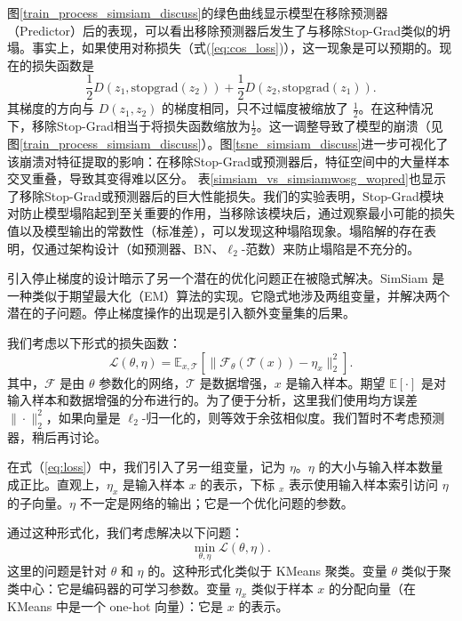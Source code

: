 \documentclass[master]{thesis-uestc}
\begin{document}
图\ref{train_process_simsiam_discuss}的绿色曲线显示模型在移除预测器（Predictor）后的表现，可以看出移除预测器后发生了与移除Stop-Grad类似的坍塌。事实上，如果使用对称损失（式(\ref{eq:cos_loss})），这一现象是可以预期的。现在的损失函数是
\begin{equation}
    \frac{1}{2}D(z_1, \text{stopgrad}(z_2)) + \frac{1}{2}D(z_2, \text{stopgrad}(z_1)).
\end{equation}
其梯度的方向与 $D(z_1, z_2)$ 的梯度相同，只不过幅度被缩放了 $\frac{1}{2}$。在这种情况下，移除Stop-Grad相当于将损失函数缩放为$\frac{1}{2}$。这一调整导致了模型的崩溃（见图\ref{train_process_simsiam_discuss}）。图\ref{tsne_simsiam_discuss}进一步可视化了该崩溃对特征提取的影响：在移除Stop-Grad或预测器后，特征空间中的大量样本交叉重叠，导致其变得难以区分。
表\ref{simsiam_vs_simsiamwosg_wopred}也显示了移除Stop-Grad或预测器后的巨大性能损失。我们的实验表明，Stop-Grad模块对防止模型塌陷起到至关重要的作用，当移除该模块后，通过观察最小可能的损失值以及模型输出的常数性（标准差），可以发现这种塌陷现象。塌陷解的存在表明，仅通过架构设计（如预测器、BN、$\ell_{2}$-范数）来防止塌陷是不充分的。

引入停止梯度的设计暗示了另一个潜在的优化问题正在被隐式解决。SimSiam 是一种类似于期望最大化（EM）算法的实现。它隐式地涉及两组变量，并解决两个潜在的子问题。停止梯度操作的出现是引入额外变量集的后果。

我们考虑以下形式的损失函数：
\begin{equation}
\label{eq:loss}
\mathcal{L}(\theta,\eta)=\mathbb{E}_{x,\mathcal{T}}\left[\|\mathcal{F}_{\theta} (\mathcal{T}(x))-\eta_{x}\|^{2}_{2}\right].
\end{equation}
其中，$\mathcal{F}$ 是由 $\theta$ 参数化的网络，$\mathcal{T}$ 是数据增强，$x$ 是输入样本。期望 $\mathbb{E}[\cdot]$ 是对输入样本和数据增强的分布进行的。为了便于分析，这里我们使用均方误差 $\|\cdot\|^{2}_{2}$，如果向量是 $\ell_{2}$-归一化的，则等效于余弦相似度。我们暂时不考虑预测器，稍后再讨论。

在式（\ref{eq:loss}）中，我们引入了另一组变量，记为 $\eta$。$\eta$ 的大小与输入样本数量成正比。直观上，$\eta_{x}$ 是输入样本 $x$ 的表示，下标 ${}_{x}$ 表示使用输入样本索引访问 $\eta$ 的子向量。$\eta$ 不一定是网络的输出；它是一个优化问题的参数。

通过这种形式化，我们考虑解决以下问题：
\begin{equation}
\label{eq:min_loss}
\min_{\theta,\eta}\mathcal{L}(\theta,\eta).
\end{equation}
这里的问题是针对 $\theta$ 和 $\eta$ 的。这种形式化类似于 KMeans 聚类。变量 $\theta$ 类似于聚类中心：它是编码器的可学习参数。变量 $\eta_{x}$ 类似于样本 $x$ 的分配向量（在 KMeans 中是一个 one-hot 向量）：它是 $x$ 的表示。
\end{document}
